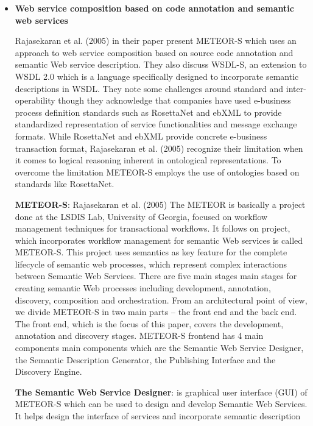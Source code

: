 \documentclass{article}
\begin{document}
\begin{itemize}
\item \textbf{Web service composition based on code annotation and semantic web services}

Rajasekaran et al. (2005) in their paper present METEOR-S which uses an approach to web service composition based on source code annotation and semantic Web service description. They also discuss WSDL-S, an extension to WSDL 2.0 which is a language specifically designed to incorporate semantic descriptions in WSDL. They note some challenges around standard and inter-operability though they acknowledge that companies have used e-business process definition standards such as RosettaNet and ebXML to provide standardized representation of service functionalities and message exchange formats. While RosettaNet and ebXML provide concrete e-business transaction format, Rajasekaran et al. (2005) recognize their limitation when it comes to logical reasoning inherent in ontological representations. To overcome the limitation METEOR-S employs the use of ontologies based on standards like RosettaNet.

\textbf{METEOR-S}: Rajasekaran et al. (2005) The METEOR is basically a project done at the LSDIS Lab, University of Georgia, focused on workflow management techniques for transactional workflows. It follows on project, which incorporates workflow management for semantic Web services is called METEOR-S. This project uses semantics as key feature for the complete lifecycle of semantic web processes, which represent complex interactions between Semantic Web Services. There are five main stages main stages for creating semantic Web processes including development, annotation, discovery, composition and orchestration. From an architectural point of view, we divide METEOR-S in two main parts – the front end and the back end. The front end, which is the focus of this paper, covers the development, annotation and discovery stages. METEOR-S frontend has 4 main components main components which are the Semantic Web Service Designer, the Semantic Description Generator, the Publishing Interface and the Discovery Engine. 

\pagebreak 

\textbf{The Semantic Web Service Designer}: is graphical user interface (GUI) of METEOR-S which can be used to design and develop Semantic Web Services. It helps design the interface of services and incorporate semantic description 


\end{itemize}
\end{document}
